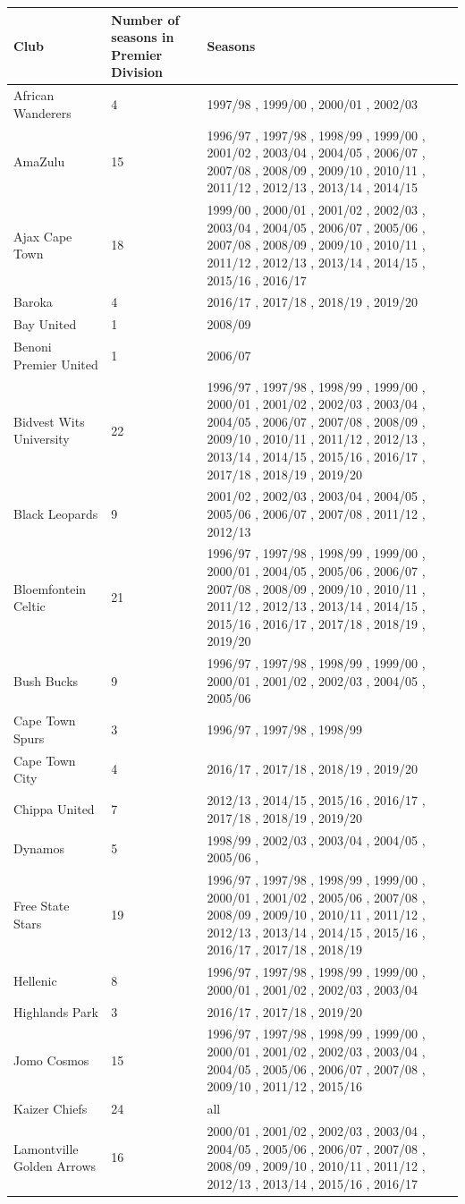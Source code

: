 \documentclass{article}
\begin{document}
\begin{tabular}{lll}
\toprule
Club & Number of seasons in Premier Division & Seasons \\
\midrule
African Wanderers & 4 & 1997/98 , 1999/00 , 2000/01 , 2002/03 \\
AmaZulu & 15 & 1996/97 , 1997/98 , 1998/99 , 1999/00 , 2001/02 , 2003/04 , 2004/05 , 2006/07 , 2007/08 , 2008/09 , 2009/10 , 2010/11 , 2011/12 , 2012/13 , 2013/14 , 2014/15 \\
Ajax Cape Town & 18 & 1999/00 , 2000/01 , 2001/02 , 2002/03 , 2003/04 , 2004/05 , 2006/07 , 2005/06 , 2007/08 , 2008/09 , 2009/10 , 2010/11 , 2011/12 , 2012/13 , 2013/14 , 2014/15 , 2015/16 , 2016/17 \\
Baroka & 4 & 2016/17 , 2017/18 , 2018/19 , 2019/20 \\
Bay United & 1 & 2008/09 \\
Benoni Premier United & 1 & 2006/07 \\
Bidvest Wits University & 22 & 1996/97 , 1997/98 , 1998/99 , 1999/00 , 2000/01 , 2001/02 , 2002/03 , 2003/04 , 2004/05 , 2006/07 , 2007/08 , 2008/09 , 2009/10 , 2010/11 , 2011/12 , 2012/13 , 2013/14 , 2014/15 , 2015/16 , 2016/17 , 2017/18 , 2018/19 , 2019/20 \\
Black Leopards & 9 & 2001/02 , 2002/03 , 2003/04 , 2004/05 , 2005/06 , 2006/07 , 2007/08 , 2011/12 , 2012/13 \\
Bloemfontein Celtic & 21 & 1996/97 , 1997/98 , 1998/99 , 1999/00 , 2000/01 , 2004/05 , 2005/06 , 2006/07 , 2007/08 , 2008/09 , 2009/10 , 2010/11 , 2011/12 , 2012/13 , 2013/14 , 2014/15 , 2015/16 , 2016/17 , 2017/18 , 2018/19 , 2019/20 \\
Bush Bucks & 9 & 1996/97 , 1997/98 , 1998/99 , 1999/00 , 2000/01 , 2001/02 , 2002/03 , 2004/05 , 2005/06 \\
Cape Town Spurs & 3 & 1996/97 , 1997/98 , 1998/99 \\
Cape Town City & 4 & 2016/17 , 2017/18 , 2018/19 , 2019/20 \\
Chippa United & 7 & 2012/13 , 2014/15 , 2015/16 , 2016/17 , 2017/18 , 2018/19 , 2019/20 \\
Dynamos & 5 & 1998/99 , 2002/03 , 2003/04 , 2004/05 , 2005/06 , \\
Free State Stars & 19 & 1996/97 , 1997/98 , 1998/99 , 1999/00 , 2000/01 , 2001/02 , 2005/06 , 2007/08 , 2008/09 , 2009/10 , 2010/11 , 2011/12 , 2012/13 , 2013/14 , 2014/15 , 2015/16 , 2016/17 , 2017/18 , 2018/19 \\
Hellenic & 8 & 1996/97 , 1997/98 , 1998/99 , 1999/00 , 2000/01 , 2001/02 , 2002/03 , 2003/04 \\
Highlands Park & 3 & 2016/17 , 2017/18 , 2019/20 \\
Jomo Cosmos & 15 & 1996/97 , 1997/98 , 1998/99 , 1999/00 , 2000/01 , 2001/02 , 2002/03 , 2003/04 , 2004/05 , 2005/06 , 2006/07 , 2007/08 , 2009/10 , 2011/12 , 2015/16 \\
Kaizer Chiefs & 24 & all \\
Lamontville Golden Arrows & 16 & 2000/01 , 2001/02 , 2002/03 , 2003/04 , 2004/05 , 2005/06 , 2006/07 , 2007/08 , 2008/09 , 2009/10 , 2010/11 , 2011/12 , 2012/13 , 2013/14 , 2015/16 , 2016/17 \\
\bottomrule
\end{tabular}
\end{document}

